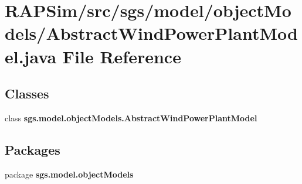 \section{R\-A\-P\-Sim/src/sgs/model/object\-Models/\-Abstract\-Wind\-Power\-Plant\-Model.java File Reference}
\label{_abstract_wind_power_plant_model_8java}
\subsection*{Classes}
\begin{DoxyCompactItemize}
\item 
class {\bf sgs.\-model.\-object\-Models.\-Abstract\-Wind\-Power\-Plant\-Model}
\end{DoxyCompactItemize}
\subsection*{Packages}
\begin{DoxyCompactItemize}
\item 
package {\bf sgs.\-model.\-object\-Models}
\end{DoxyCompactItemize}
